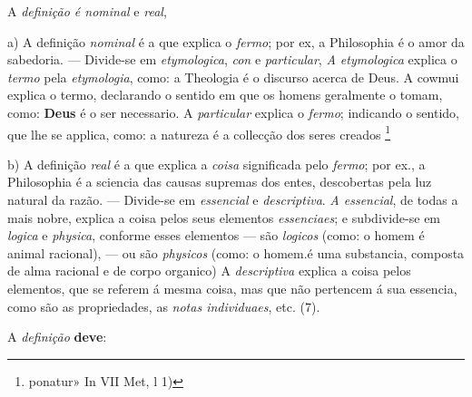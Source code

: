 
A \emph{definição é nominal} e \emph{real},

a) A definição \emph{nominal} é a que explica o \emph{fermo}; por ex, a Philosophia é o amor da sabedoria. --- Divide-se em \emph{etymologica}, \emph{con} e \emph{particular}, \emph{A etymologica} explica o \emph{termo} pela \emph{etymologia}, como: a Theologia é o discurso acerca de Deus. A cowmui explica o termo, declarando o sentido em que os homens geralmente o tomam, como: \textbf{Deus} é o ser necessario. A \emph{particular} explica o \emph{fermo}; indicando o sentido, que lhe se applica, como: a natureza é a collecção dos seres creados \footnote{ponatur» In VII Met, l 1)}

b) A definição \emph{real} é a que explica a \emph{coisa} significada pelo \emph{fermo}; por ex., a Philosophia é a sciencia das causas supremas dos entes, descobertas pela luz natural da razão. --- Divide-se em \emph{essencial} e \emph{descriptiva}. \emph{A essencial}, de todas a mais nobre, explica a coisa pelos seus elementos \emph{essenciaes}; e subdivide-se em \emph{logica} e \emph{physica}, conforme esses elementos --- são \emph{logicos} (como: o homem é animal racional), --- ou são \emph{physicos} (como: o homem.é uma substancia, composta de alma racional e de corpo organico) A \emph{descriptiva} explica a coisa pelos elementos, que se referem á mesma coisa, mas que não pertencem á sua essencia, como são as propriedades, as \emph{notas individuaes}, etc. (7).


 
A \emph{definição} \textbf{deve}:

